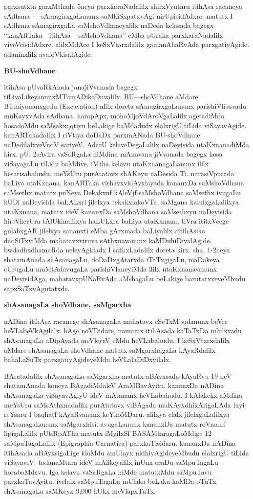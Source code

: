 \documentclass[11pt,a4size]{article}
\begin{document}
parxsutxta garxMthada 5neya parxkaraNadalilx shirxVyutaru itihAsa
racaneya sAdhana --- sAmagirxgaLanunx saMkiSxpatxvAgi
nirUpisidAdxre. matutx I sAdhana sAmagirxgaLa saMshoVdhaneyalilx naDeda
kelasada bagegx ``kanARTaka---itihAsa---saMshoVdhana'' eMba pUraka
parxkaraNadalilx viveVcisidAdxre. alilxMdAce I keSxVtarxdalilx
gamanAhaRvAda parxgatiyAgide. adaninxlilx avaloVkisalAgide.

\medskip
\noindent
\textbf{\Large BU-shoVdhane}

\smallskip
itihAsa pUvaRkAlada janajiVvanada bagegx
tiLivaLikeyanunxMTumADikoDuvalilx, BU---shoVdhane aMdare
BUmiyananxgedu {\rm (Excavation)} alilx doreta
sAmagirxgaLanunx parishiVlisuvadu muKayxvAda sAdhana. harapApx,
mohoMjoVdAroVgaLalilx agetadiMda hosadoMdu saMsakxqqtiyu beLakige
baMdadudx elalxrigU tiLida viSayavAgide. kanARTakadalilx I riVtiya
doDaDx parxmANada BU-shoVdhane naDedilalxveVnoV sariyeV. AdarU
kelaveDegaLalilx naDeyisida utaKxnanadiMda kirx. pU. 2sAvira vaSaRgaLa
hiMdina mAnavana jiVvanada bagegx hosa viSayagaLu tiLidu
baMdive. iMtha kelavu utaKxnanagaLanunx ililx hesarisabahudu. meYsUru
purAtatavx shAKeyu naDesida Ti. narasiVpurada baLiya utaKxnana,
kanARTaka vishavxvidAyxlayada kananxDa saMshoVdhana saMsethx matutx
puNeya Dekakxnf kAleVjf saMshoVdhana saMsethx ivugaLu kUDi naDeyisida
baLALxri jilelxya tekakxlakoVTa, saMgana kalulxgaLalilxya utaKxnana,
matutx ideV kananxDa saMshoVdhana saMsethxyu naDeyisida hireVkerUra
tAlUkinalilxya haLULxra baLiya utaKxnana, tiVra ititxVcege gulabxgAR
jilelxya sananxti eMba gArxmada baLiyalilx aitihAsika daqSiTxyiMda
mahatavxviruva sAthxnavanunx kaMDuhiDiyalAgide. bwdadhxdhamaRda
neleyAgidadx I sathxLadalilx doreta kirx. sha. 1-2neya shatamAnada
shAsanagaLu, doDaDxgAtarxda iTaTxgigaLu, maDakeya cUrugaLu muMtAdavugaLa
parishiVlaneyiMda ililx utaKxnanavanunx naDeyisidAga,
mahatavxpUNaRvAda aMshagaLu beLakige barutatxveyeMbudu
sapxSaTxvAgutatxde.

\medskip
\noindent
\textbf{\Large shAsanagaLa shoVdhane, saMgarxha}
\smallskip

nADina itihAsa racanege shAsanagaLa mahatavx eSeTxMbudanunx beVre
heVLabeVkAgilalx. hAge noVDidare, namamx itihAsada kaTaTxDa nilulxvadu
shAsanagaLa aDipAyada meVleyeV eMdu heVLabahudu. I keSxVtarxdalilx
aMdare shAsanagaLa shoVdhane matutx saMgarxhagaLa kAyaRdalilx
bahaLaSuTx parxgatiyAgideyeMdu heVLalaDiDxyilalx.

BAratadalilx shAsanagaLa saMgarxha matutx aBAyxsada kAyaRvu 19 neV
shatamAnada koneya BAgadiMdaleV AraMBavAyitu. kananxDa nADina
shAsanagaLa viSayavAgiyU ideV mAtanunx heVLabahudu. I kAlakekx aMdina
meYsUru saMsAthxnadalilx purAtatavx viBAgada muKAyxdhikArigaLAda luyi
reYsaru I baqhatf kAyaRvanunx keYkoMDaru. alilxya elalx
jilelxgaLalilxya shAsanagaLanunx saMgarxhisi. avugaLanunx kananxDa
matutx roVmanf lipigaLalilx pUtiRpATha matutx iMgilxSf
BASAMtaragaLoMdige 12 saMpuTagaLalilx {\rm (Epigraphia
    Carnatica)} parxkaTisidaru. kananxDa nADina itihAsada
aBAyxsigaLige idoMdu amUlayx nidhiyAgideyeMbudu elalxrigU tiLida
viSayaveV. tadanaMtara ideV mAlikeyalilx inUnx eraDu saMpuTagaLu
horabaMdavu. Iga kelavu vaSaRgaLa hiMde matotxMdu saMpuTavu
parxkaTavAyitu. ivelalx saMpuTagaLa mUlaka beLaku kaMDa oTuTx
shAsanagaLa saMKeyx 9,000 kUkx meVlapxTuTx.
\end{document}
